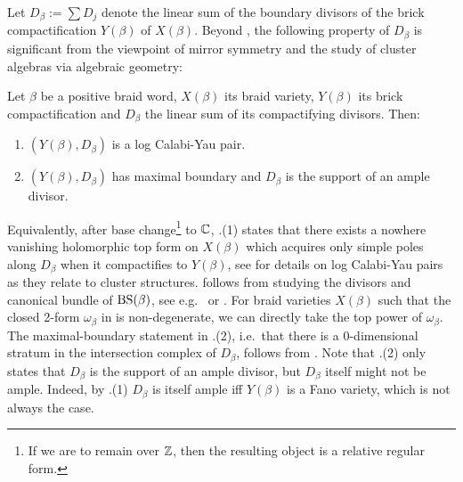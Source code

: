 \noindent Let $D_\beta:=\sum D_j$ denote the linear sum of the boundary divisors of the brick compactification $Y(\beta)$ of $X(\beta)$. Beyond , the following property of $D_\beta$ is significant from the viewpoint of mirror symmetry and the study of cluster algebras via algebraic geometry:

\begin{proposition}\label{prop:logCY}
Let $\beta$ be a positive braid word, $X(\beta)$ its braid variety, $Y(\beta)$ its brick compactification and $D_\beta$ the linear sum of its compactifying divisors. Then:
\begin{enumerate}
    \item $(Y(\beta),D_\beta)$ is a log Calabi-Yau pair.
    \item $(Y(\beta),D_\beta)$ has maximal boundary and $D_\beta$ is the support of an ample divisor.\sbs
\end{enumerate}

\end{proposition}

\noindent Equivalently, after base change\footnote{If we are to remain over $\mathbb{Z}$, then the resulting object is a relative regular form.} to $\mathbb{C}$, .(1) states that there exists a nowhere vanishing holomorphic top form on $X(\beta)$ which acquires only simple poles along $D_\beta$ when it compactifies to $Y(\beta)$, see \cite{HackingKeel_ICM18} for details on log Calabi-Yau pairs as they relate to cluster structures.  follows from studying the divisors and canonical bundle of $\operatorname{BS}(\beta)$, see e.g.~\cite{Anderson,LauTho} or \cite[Lemma 4.9]{CasalsWeng22}. For braid varieties $X(\beta)$ such that the closed 2-form $\omega_\beta$ in  is non-degenerate, we can directly take the top power of $\omega_\beta$.\\

\noindent The maximal-boundary statement in .(2), i.e.~that there is a 0-dimensional stratum in the intersection complex of $D_\beta$, follows from . Note that .(2) only states that $D_\beta$ is the support of an ample divisor, but $D_\beta$ itself might not be ample. Indeed, by .(1) $D_\beta$ is itself ample iff $Y(\beta)$ is a Fano variety, which is not always the case.%

